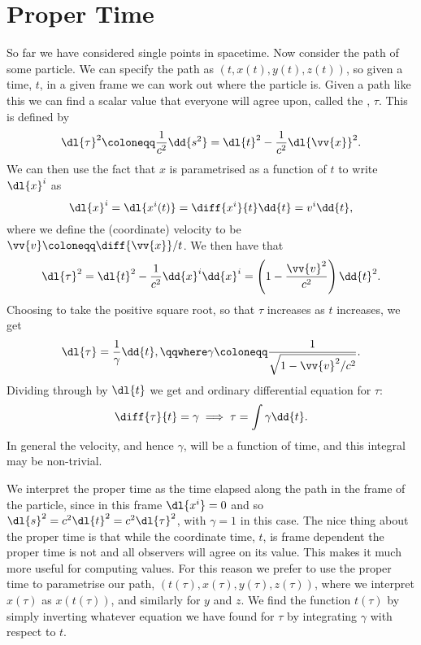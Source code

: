 \section{Proper Time}
So far we have considered single points in spacetime.
Now consider the path of some particle.
We can specify the path as \((t, x(t), y(t), z(t))\), so given a time, \(t\), in a given frame we can work out where the particle is.
Given a path like this we can find a scalar value that everyone will agree upon, called the , \(\tau\).
This is defined by
\begin{equation}
    \dl{\tau}^2 \coloneqq \frac{1}{c^2}\dd{s^2} = \dl{t}^2 - \frac{1}{c^2}\dl{\vv{x}}^2.
\end{equation}
We can then use the fact that \(x\) is parametrised as a function of \(t\) to write \(\dl{x}^i\) as
\begin{equation}
    \dl{x}^i = \dl{x^i(t)} = \diff{x^i}{t}\dd{t} = v^i\dd{t},
\end{equation}
where we define the (coordinate) velocity to be \(\vv{v} \coloneqq \diff{\vv{x}}/{t}\).
We then have that
\begin{equation}
    \dl{\tau}^2 = \dl{t}^2 - \frac{1}{c^2}\dd{x}^i\dd{x}^i = \left( 1 - \frac{\vv{v}^2}{c^2} \right) \dd{t}^2.
\end{equation}
Choosing to take the positive square root, so that \(\tau\) increases as \(t\) increases, we get
\begin{equation}
    \dl{\tau} = \frac{1}{\gamma}\dd{t}, \qqwhere \gamma \coloneqq \frac{1}{\sqrt{1 - \vv{v}^2/c^2}}.
\end{equation}
Dividing through by \(\dl{t}\) we get and ordinary differential equation for \(\tau\):
\begin{equation}
    \diff{\tau}{t} = \gamma \implies \tau = \int \gamma \dd{t}.
\end{equation}
In general the velocity, and hence \(\gamma\), will be a function of time, and this integral may be non-trivial.

We interpret the proper time as the time elapsed along the path in the frame of the particle, since in this frame \(\dl{x^i} = 0\) and so \(\dl{s}^2 = c^2\dl{t}^2 = c^2\dl{\tau}^2\), with \(\gamma = 1\) in this case.
The nice thing about the proper time is that while the coordinate time, \(t\), is frame dependent the proper time is not and all observers will agree on its value.
This makes it much more useful for computing values.
For this reason we prefer to use the proper time to parametrise our path, \((t(\tau), x(\tau), y(\tau), z(\tau))\), where we interpret \(x(\tau)\) as \(x(t(\tau))\), and similarly for \(y\) and \(z\).
We find the function \(t(\tau)\) by simply inverting whatever equation we have found for \(\tau\) by integrating \(\gamma\) with respect to \(t\).

